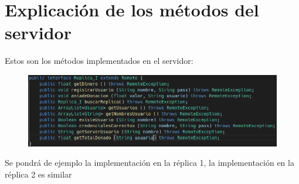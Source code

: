 \documentclass{article}
\begin{document}
	\section{Explicación de los métodos del servidor}
	Estos son los métodos implementados en el servidor:
	\begin{figure}[H]
		\centering
		\includegraphics[totalheight=3.5cm]{img/7.png}
	\end{figure}
	Se pondrá de ejemplo la implementación en la réplica 1, la implementación en la réplica 2 es similar
\end{document}
